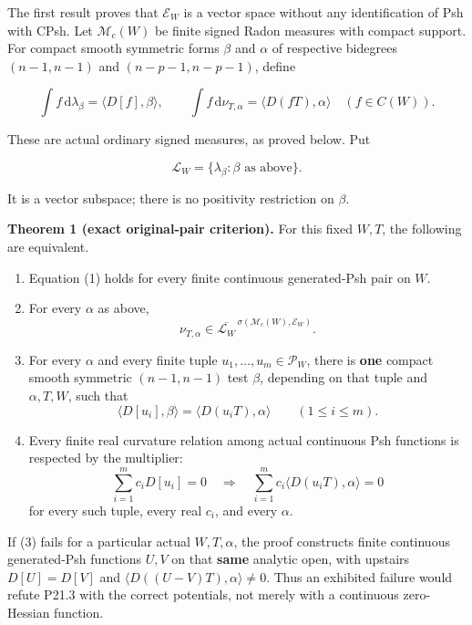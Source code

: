 \documentclass[
  11pt,
]{article}
\providecommand{\tightlist}{%
  \setlength{\itemsep}{0pt}\setlength{\parskip}{0pt}}
\begin{document}
The first result proves that \(\mathcal E_W\) is a vector space without
any identification of Psh with CPsh. Let \(\mathscr M_c(W)\) be finite
signed Radon measures with compact support. For compact smooth symmetric
forms \(\beta\) and \(\alpha\) of respective bidegrees \((n-1,n-1)\) and
\((n-p-1,n-p-1)\), define

\[
\int f\,\mathrm d\lambda_\beta=\langle D[f],\beta\rangle,
\qquad
\int f\,\mathrm d\nu_{T,\alpha}=\langle D(fT),\alpha\rangle
\quad(f\in C(W)). \tag{2}
\]

These are actual ordinary signed measures, as proved below. Put

\[
\mathscr L_W=\{\lambda_\beta:\beta\text{ as above}\}.
\]

It is a vector subspace; there is no positivity restriction on
\(\beta\).

\textbf{Theorem 1 (exact original-pair criterion).} For this fixed
\(W,T\), the following are equivalent.

\begin{enumerate}
\def\labelenumi{\arabic{enumi}.}
\tightlist
\item
  Equation (1) holds for every finite continuous generated-Psh pair on
  \(W\).
\item
  For every \(\alpha\) as above,
  \[\nu_{T,\alpha}\in\overline{\mathscr L_W}^{\,\sigma(\mathscr M_c(W),\mathcal E_W)}. \tag{3}\]
\item
  For every \(\alpha\) and every finite tuple
  \(u_1,\ldots,u_m\in\mathcal P_W\), there is \textbf{one} compact
  smooth symmetric \((n-1,n-1)\) test \(\beta\), depending on that tuple
  and \(\alpha,T,W\), such that
  \[\langle D[u_i],\beta\rangle=\langle D(u_iT),\alpha\rangle\qquad(1\leq i\leq m). \tag{4}\]
\item
  Every finite real curvature relation among actual continuous Psh
  functions is respected by the multiplier: \[\sum_{i=1}^m c_iD[u_i]=0
  \quad\Longrightarrow\quad
  \sum_{i=1}^m c_i\langle D(u_iT),\alpha\rangle=0 \tag{5}\] for every
  such tuple, every real \(c_i\), and every \(\alpha\).
\end{enumerate}

If (3) fails for a particular actual \(W,T,\alpha\), the proof
constructs finite continuous generated-Psh functions \(U,V\) on that
\textbf{same} analytic open, with upstairs \(D[U]=D[V]\) and
\(\langle D((U-V)T),\alpha\rangle\ne0\). Thus an exhibited failure would
refute P21.3 with the correct potentials, not merely with a continuous
zero-Hessian function.
\end{document}
